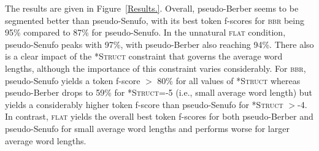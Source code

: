 \documentclass[11pt]{article}
\begin{document}
The results are given in Figure~\ref{Results.}. Overall, pseudo-Berber seems to be segmented better than pseudo-Senufo, with its best token f-scores for \textsc{bbr} being 95\% compared to 87\% for pseudo-Senufo. In the unnatural \textsc{flat} condition, pseudo-Senufo peaks with 97\%, with pseudo-Berber also reaching 94\%. There also is a clear impact of the \textsc{*Struct} constraint that governs the average word lengths, although the importance of this constraint varies considerably. For \textsc{bbr}, pseudo-Senufo yields a token f-score $>$ 80\% for all values of \textsc{*Struct} whereas pseudo-Berber drops to 59\% for \textsc{*Struct}=-5 (i.e., small average word length) but yields a considerably higher token f-score than pseudo-Senufo for \textsc{*Struct} $>$-4. In contrast, \textsc{flat} yields the overall best token f-scores for both pseudo-Berber and pseudo-Senufo for small average word lengths and performs worse for larger average word lengths.
\end{document}
